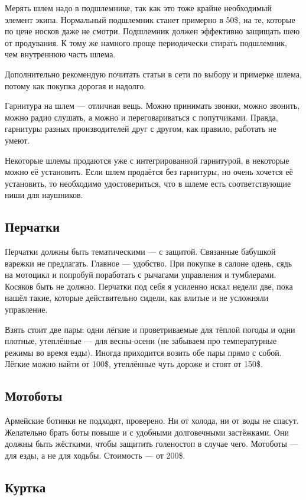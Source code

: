 \documentclass[12pt,a4paper]{article}
\begin{document}
Мерять шлем надо в подшлемнике, так как это тоже крайне необходимый
элемент экипа. Нормальный подшлемник станет примерно в 50\$, на те,
которые по цене носков даже не смотри. Подшлемник должен эффективно
защищать шею от продувания. К тому же намного проще периодически
стирать подшлемник, чем внутреннюю часть шлема.

Дополнительно рекомендую почитать статьи в сети по выбору и примерке
шлема, потому как покупка дорогая и надолго.

Гарнитура на шлем --- отличная вещь. Можно принимать звонки, можно
звонить, можно радио слушать, а можно и переговариваться с попутчиками.
Правда, гарнитуры разных производителей друг с другом, как правило,
работать не умеют.

Некоторые шлемы продаются уже с интегрированной гарнитурой, в некоторые
можно её установить. Если шлем продаётся без гарнитуры, но очень хочется
её установить, то необходимо удостовериться, что в шлеме есть
соответствующие ниши для наушников.

\subsection{Перчатки}

Перчатки должны быть тематическими --- с защитой. Связанные бабушкой
варежки не предлагать. Главное --- удобство. При покупке в салоне одень,
сядь на мотоцикл и попробуй поработать с рычагами управления и
тумблерами. Косяков быть не должно. Перчатки под себя я усиленно искал
недели две, пока нашёл такие, которые действительно сидели, как влитые
и не усложняли управление.

Взять стоит две пары: одни лёгкие и проветриваемые для тёплой погоды и
одни плотные, утеплённые --- для весны-осени (не забываем про
температурные режимы во время езды). Иногда приходится возить обе пары
прямо с собой. Лёгкие можно найти от 100\$, утеплённые чуть дороже и
стоят от 150\$.

\subsection{Мотоботы}

Армейские ботинки не подходят, проверено. Ни от холода, ни от воды не
спасут. Желательно брать боты повыше и с удобными долговечными
застёжками. Они должны быть жёсткими, чтобы защитить голеностоп в
случае чего. Мотоботы --- для езды, а не для ходьбы. Стоимость --- от 200\$.

\subsection{Куртка}
\end{document}
